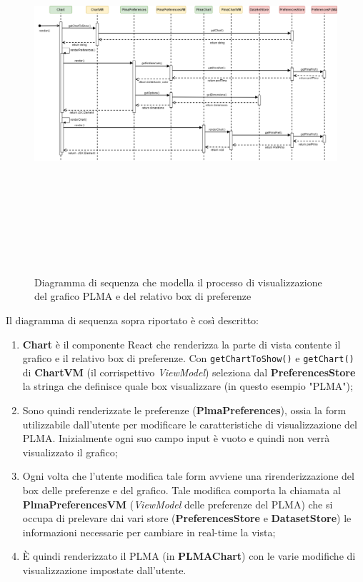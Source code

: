 \newpage
\begin{landscape}
\begin{figure}[hb]
\includegraphics[width=\linewidth ,height=14cm]{Images/Allegato Tecnico-Sequenza-PLMApref}
\centering
\caption{Diagramma di sequenza che modella il processo di visualizzazione del grafico PLMA e del relativo box di preferenze}
\end{figure}
\end{landscape}
Il diagramma di sequenza sopra riportato è così descritto:
\begin{enumerate}[label=\textbf{\arabic*})]
	\item \textbf{Chart} è il componente React che renderizza la parte di vista contente il grafico e il relativo box di preferenze. Con \texttt{getChartToShow()} e \texttt{getChart()} di \textbf{ChartVM} (il corrispettivo \textit{ViewModel}) seleziona dal \textbf{PreferencesStore} la stringa che definisce quale box visualizzare (in questo esempio "PLMA");
	\item Sono quindi renderizzate le preferenze (\textbf{PlmaPreferences}), ossia la form utilizzabile dall'utente per modificare le caratteristiche di visualizzazione del PLMA. Inizialmente ogni suo campo input è vuoto e quindi non verrà visualizzato il grafico; 
	\item Ogni volta che l'utente modifica tale form avviene una rirenderizzazione del box delle preferenze e del grafico. Tale modifica comporta la chiamata al \textbf{PlmaPreferencesVM} (\textit{ViewModel} delle preferenze del PLMA) che si occupa di prelevare dai vari store (\textbf{PreferencesStore} e \textbf{DatasetStore}) le informazioni necessarie per cambiare in real-time la vista;
	\item È quindi renderizzato il PLMA (in \textbf{PLMAChart}) con le varie modifiche di visualizzazione impostate dall'utente.
\end{enumerate}

\newpage